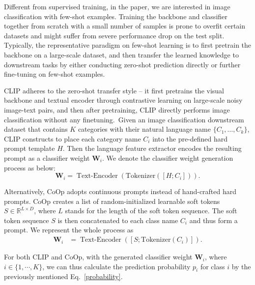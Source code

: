 \documentclass[default,iicol]{sn-jnl}%
\theoremstyle{thmstyleone}%
\theoremstyle{thmstyletwo}%
\theoremstyle{thmstylethree}%
\begin{document}
Different from supervised training, in the paper, we are interested in image classification with few-shot examples. Training the backbone and classifier together from scratch with a small number of samples is prone to overfit certain datasets and might suffer from severe performance drop on the test split. Typically, the representative paradigm on few-shot learning is to first pretrain the backbone on a large-scale dataset, and then transfer the learned knowledge to downstream tasks by either conducting zero-shot prediction directly or further fine-tuning on few-shot examples. 

CLIP adheres to the zero-shot transfer style -- it first pretrains the visual backbone and textual encoder through contrastive learning on large-scale noisy image-text pairs, and then after pretraining, CLIP directly performs image classification without any finetuning.~Given an image classification downstream dataset that contains $K$ categories with their natural language name $\{C_{1}, \dots, C_k\}$, CLIP constructs to place each category name $C_i$ into the pre-defined hard prompt template $H$. Then the language feature extractor encodes the resulting prompt as a classifier weight $\mathbf{W}_i$. We denote the classifier weight generation process as below:
\begin{equation}
        \mathbf{W}_{i} = \operatorname{Text-Encoder}(\mathrm{Tokenizer}([H; C_{i}])).
        \label{eq:weight_clip}
\end{equation}

Alternatively, CoOp adopts continuous prompts instead of hand-crafted hard prompts. CoOp creates a list of random-initialized learnable soft tokens $S \in \mathbb{R}^{L \times D}$, where $L$ stands for the length of the soft token sequence. The soft token sequence $S$ is then concatenated to each class name $C_i$ and thus form a prompt. We represent the whole process as 
\begin{equation}
    \label{eq:weight_coop}
    \begin{aligned}
        \mathbf{W}_{i} &= \operatorname{Text-Encoder}([S; \mathrm{Tokenizer}(C_{i})]).
    \end{aligned}
\end{equation}

For both CLIP and CoOp, with the generated classifier weight $\mathbf{W}_i$, where $i \in \{1, \cdots, K\}$, we can thus calculate the prediction probability $p_i$ for class $i$ by the previously mentioned Eq.~\eqref{probability}.
\end{document}
